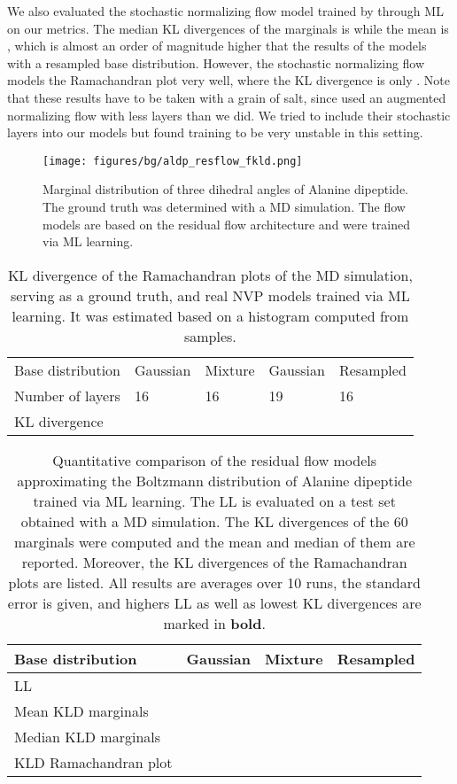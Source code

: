 \documentclass[twoside]{article}
\begin{document}
We also evaluated the stochastic normalizing flow model trained by \cite{Wu2020} through ML on our metrics. The median KL divergences of the marginals is  while the mean is , which is almost an order of magnitude higher that the results of the models with a resampled base distribution. However, the stochastic normalizing flow models the Ramachandran plot very well, where the KL divergence is only . Note that these results have to be taken with a grain of salt, since \cite{Wu2020} used an augmented normalizing flow with less layers than we did. We tried to include their stochastic layers into our models but found training to be very unstable in this setting.

\begin{figure}[h]
    \centering
    \texttt{[image: figures/bg/aldp\_resflow\_fkld.png]}
    \caption{Marginal distribution of three dihedral angles of Alanine dipeptide. The ground truth was determined with a MD simulation. The flow models are based on the residual flow architecture and were trained via ML learning.}
    \label{fig:aldp_resflow_fkld}
\end{figure}

\begin{table}[h]
  \caption{KL divergence of the Ramachandran plots of the MD simulation, serving as a ground truth, and real NVP models trained via ML learning. It was estimated based on a histogram computed from  samples.}
  \label{tab:kld_ramachandran_rnvp_fkld}
  \centering
  \vspace{0.3cm}
  \begin{tabular}{l|llll}
    Base distribution & Gaussian & Mixture & Gaussian & Resampled \\
    Number of layers & 16 & 16 & 19 & 16  \\
    \hline
    KL divergence &  &  &  &  
  \end{tabular}
\end{table}

\begin{table}[h]
  \caption{Quantitative comparison of the residual flow models approximating the Boltzmann distribution of Alanine dipeptide trained via ML learning. The LL is evaluated on a test set obtained with a MD simulation. The KL divergences of the 60 marginals were computed and the mean and median of them are reported. Moreover, the KL divergences of the Ramachandran plots are listed. All results are averages over 10 runs, the standard error is given, and highers LL as well as lowest KL divergences are marked in \textbf{bold}.}
  \label{tab:aldp_kld_fkld_resflow}
  \centering
  \vspace{0.3cm}
  \begin{tabular}{l|lll}
    Base distribution & Gaussian & Mixture & Resampled \\
    \hline
    LL  &  &  &  \\
    Mean KLD marginals  &  &  &  \\
    Median KLD marginals  &  &  &  \\
    KLD Ramachandran plot &  &  & 
  \end{tabular}
\end{table}
\end{document}

